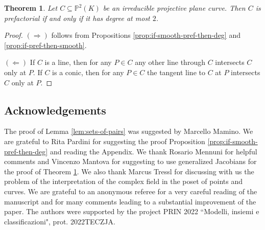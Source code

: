 \documentclass{amsart}
\theoremstyle{plain}
\newtheorem{thm}{Theorem}[section]
\theoremstyle{definition}
\begin{document}
\begin{thm}\label{thm:characterize-prefactoriality}
	Let $C \subseteq \mathbb{P}^2(K)$ be an irreducible projective plane curve. Then $C$ is prefactorial if and only if it has degree at most $2$.
\end{thm}

\begin{proof}
	$(\Rightarrow)$ follows from Propositions \ref{prop:if-smooth-pref-then-deg} and \ref{prop:if-pref-then-smooth}. 
	
	$(\Leftarrow)$ If $C$ is a line, then for any $P \in C$ any other line through $C$ intersects $C$ only at $P$. If $C$ is a conic, then for any $P \in C$ the tangent line to $C$ at $P$ intersects $C$ only at $P$.
\end{proof}

\subsection*{Acknowledgements} The proof of Lemma \ref{lem:sets-of-pairs} was suggested by Marcello Mamino. We are grateful to Rita Pardini for suggesting the proof Proposition \ref{prop:if-smooth-pref-then-deg} and reading the Appendix. We thank Rosario Mennuni for helpful comments and Vincenzo Mantova for suggesting to use generalized Jacobians for the proof of Theorem \ref{thm:characterize-prefactoriality}. We also thank Marcus Tressl for discussing with us the problem of the interpretation of the complex field in the poset of points and curves. We are grateful to an anonymous referee for a very careful reading of the manuscript and for many comments leading to a substantial improvement of the paper. The authors were supported by the project PRIN 2022 ``Modelli, insiemi e classificazioni", prot. 2022TECZJA.
	
\end{document}
